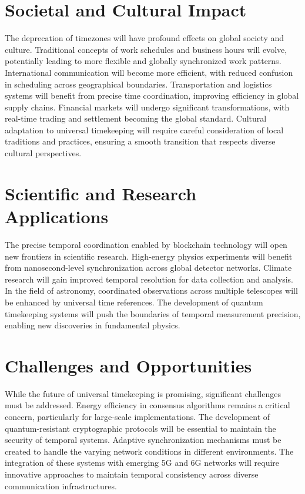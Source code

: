\documentclass[12pt]{report}
\begin{document}
\section{Societal and Cultural Impact}
The deprecation of timezones will have profound effects on global society and culture. Traditional concepts of work schedules and business hours will evolve, potentially leading to more flexible and globally synchronized work patterns. International communication will become more efficient, with reduced confusion in scheduling across geographical boundaries. Transportation and logistics systems will benefit from precise time coordination, improving efficiency in global supply chains. Financial markets will undergo significant transformations, with real-time trading and settlement becoming the global standard. Cultural adaptation to universal timekeeping will require careful consideration of local traditions and practices, ensuring a smooth transition that respects diverse cultural perspectives.

\section{Scientific and Research Applications}
The precise temporal coordination enabled by blockchain technology will open new frontiers in scientific research. High-energy physics experiments will benefit from nanosecond-level synchronization across global detector networks. Climate research will gain improved temporal resolution for data collection and analysis. In the field of astronomy, coordinated observations across multiple telescopes will be enhanced by universal time references. The development of quantum timekeeping systems will push the boundaries of temporal measurement precision, enabling new discoveries in fundamental physics.

\section{Challenges and Opportunities}
While the future of universal timekeeping is promising, significant challenges must be addressed. Energy efficiency in consensus algorithms remains a critical concern, particularly for large-scale implementations. The development of quantum-resistant cryptographic protocols will be essential to maintain the security of temporal systems. Adaptive synchronization mechanisms must be created to handle the varying network conditions in different environments. The integration of these systems with emerging 5G and 6G networks will require innovative approaches to maintain temporal consistency across diverse communication infrastructures.
\end{document}
